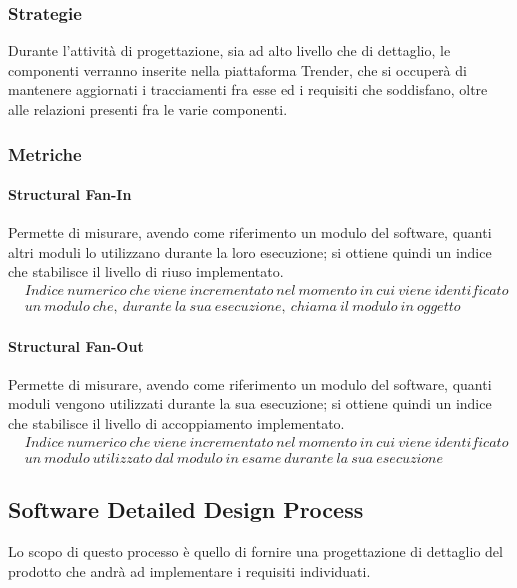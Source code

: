\documentclass[../PianoDiQualifica.tex]{subfiles}
\begin{document}
			\subsubsection{Strategie}
			Durante l'attività di progettazione, sia ad alto livello che di dettaglio, le componenti verranno inserite nella piattaforma Trender, che si occuperà di mantenere aggiornati i tracciamenti fra esse ed i requisiti che soddisfano, oltre alle relazioni presenti fra le varie componenti.
			\subsubsection{Metriche}
				\paragraph{Structural Fan-In}
				Permette di misurare, avendo come riferimento un modulo del software, quanti altri moduli lo utilizzano durante la loro esecuzione; si ottiene quindi un indice che stabilisce il livello di riuso implementato.
				\begin{equation*}
					\begin{split}
						&Indice \ numerico \ che \ viene \ incrementato \ nel \ momento \ in \ cui \ viene \ identificato \\
						&un \ modulo \ che, \ durante \ la \ sua \ esecuzione, \ chiama \ il \ modulo \ in \ oggetto
					\end{split}
				\end{equation*}
				
				\paragraph{Structural Fan-Out}
				Permette di misurare, avendo come riferimento un modulo del software, quanti moduli vengono utilizzati durante la sua esecuzione; si ottiene quindi un indice che stabilisce il livello di accoppiamento implementato.
				\begin{equation*}
					\begin{split}
						&Indice \ numerico \ che \ viene \ incrementato \ nel \ momento \ in \ cui \ viene \ identificato \\
						&un \ modulo \ utilizzato \ dal \ modulo \ in \ esame \ durante \ la \ sua \ esecuzione
					\end{split}
				\end{equation*}

		
		\subsection{Software Detailed Design Process}
		Lo scopo di questo processo è quello di fornire una progettazione di dettaglio del prodotto che andrà ad implementare i requisiti individuati.
		
\end{document}
